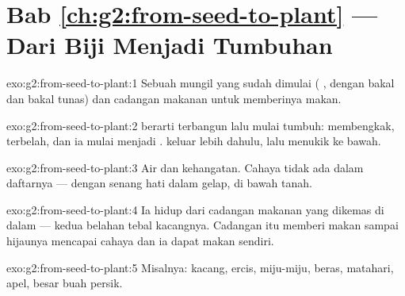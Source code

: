 \section*{Bab \ref{ch:g2:from-seed-to-plant} --- Dari Biji Menjadi Tumbuhan}

\begin{solution}{exo:g2:from-seed-to-plant:1}
Sebuah  mungil yang sudah dimulai ( , dengan
bakal  dan bakal tunas) dan cadangan makanan untuk memberinya
makan.
\end{solution}

\begin{solution}{exo:g2:from-seed-to-plant:2}
 berarti terbangun lalu mulai tumbuh:  membengkak,
 terbelah, dan ia mulai menjadi .  keluar lebih
dahulu, lalu menukik ke bawah.
\end{solution}

\begin{solution}{exo:g2:from-seed-to-plant:3}
Air dan kehangatan. Cahaya tidak ada dalam daftarnya --- 
 dengan senang hati dalam gelap, di bawah tanah.
\end{solution}

\begin{solution}{exo:g2:from-seed-to-plant:4}
Ia hidup dari cadangan makanan yang dikemas di dalam  --- kedua
belahan tebal kacangnya. Cadangan itu memberi makan  sampai
 hijaunya mencapai cahaya dan ia dapat makan sendiri.
\end{solution}

\begin{solution}{exo:g2:from-seed-to-plant:5}
Misalnya: kacang, ercis, miju-miju, beras,   matahari, 
apel,  besar buah persik.
\end{solution}


